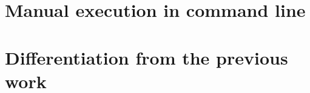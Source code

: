 \section{Manual execution in command line}
\label{sec:manual_execution}

\section{Differentiation from the previous work}
\label{sec:diff_previous}


